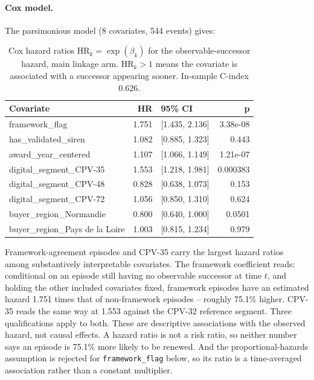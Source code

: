 \documentclass[11pt,a4paper]{article}
\newcommand{\code}[1]{\texttt{#1}}
\begin{document}
\paragraph{Cox model.} The parsimonious model
(8 covariates,
544 events) gives:
\begin{table}[H]
\centering
\small
\begin{tabularx}{\textwidth}{lrlr}
\toprule
Covariate & HR & 95\% CI & p \\
\midrule
framework\_flag & 1.751 & [1.435, 2.136] & 3.38e-08 \\
has\_validated\_siren & 1.082 & [0.885, 1.323] & 0.443 \\
award\_year\_centered & 1.107 & [1.066, 1.149] & 1.21e-07 \\
digital\_segment\_CPV-35 & 1.553 & [1.218, 1.981] & 0.000383 \\
digital\_segment\_CPV-48 & 0.828 & [0.638, 1.073] & 0.153 \\
digital\_segment\_CPV-72 & 1.056 & [0.850, 1.310] & 0.624 \\
buyer\_region\_Normandie & 0.800 & [0.640, 1.000] & 0.0501 \\
buyer\_region\_Pays de la Loire & 1.003 & [0.815, 1.234] & 0.979 \\
\bottomrule
\end{tabularx}
\caption{Cox hazard ratios \(\mathrm{HR}_k=\exp(\beta_k)\) for the
observable-successor hazard, main linkage arm. \(\mathrm{HR}_k>1\) means the
covariate is associated with a successor appearing sooner. In-sample C-index
0.626.}
\end{table}
Framework-agreement episodes and CPV-35 carry the largest hazard ratios among
substantively interpretable covariates. The framework coefficient reads:
conditional on an episode still having no observable successor at time \(t\),
and holding the other included covariates fixed, framework episodes have an
estimated hazard 1.751
times that of non-framework episodes -- roughly
75.1\%
higher. CPV-35 reads the same way at
1.553
against the CPV-32 reference segment. Three qualifications apply to both. These
are descriptive associations with the observed hazard, not causal effects. A
hazard ratio is not a risk ratio, so neither number says an episode is
75.1\%
more likely to be renewed. And the proportional-hazards assumption is rejected
for \code{framework\_flag} below, so its ratio is a time-averaged association
rather than a constant multiplier.
\end{document}
